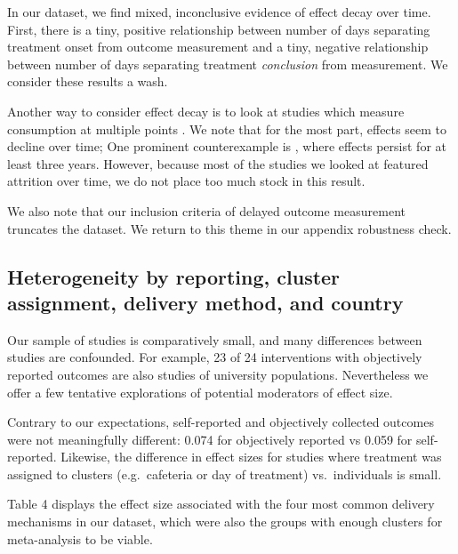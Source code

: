 \documentclass[sn-nature,referee,pdflatex]{sn-jnl}
\begin{document}
In our dataset, we find mixed, inconclusive evidence of effect decay
over time. First, there is a tiny, positive relationship between number
of days separating treatment onset from outcome measurement and a tiny,
negative relationship between number of days separating treatment
\emph{conclusion} from measurement. We consider these results a wash.

Another way to consider effect decay is to look at studies which measure
consumption at multiple points
\citep[e.g.][]{bianchi2022, bochmann2017, bschaden2020, carfora2023, jalil2023}.
We note that for the most part, effects seem to decline over time; One
prominent counterexample is \citep{jalil2023}, where effects persist for
at least three years. However, because most of the studies we looked at
featured attrition over time, we do not place too much stock in this
result.

We also note that our inclusion criteria of delayed outcome measurement
truncates the dataset. We return to this theme in our appendix
robustness check.

\begin{comment} There is probably a way to do this quantitatively and if we get asked to do it in review, I'll do it, but it's a fair bit of work and I think we've made the general point 
\end{comment}

\subsection{Heterogeneity by reporting, cluster assignment, delivery
method, and country}\label{sec2.11}

Our sample of studies is comparatively small, and many differences
between studies are confounded. For example, 23 of 24 interventions with
objectively reported outcomes are also studies of university
populations. Nevertheless we offer a few tentative explorations of
potential moderators of effect size.

Contrary to our expectations, self-reported and objectively collected
outcomes were not meaningfully different: 0.074 for objectively reported
vs 0.059 for self-reported. Likewise, the difference in effect sizes for
studies where treatment was assigned to clusters (e.g.~cafeteria or day
of treatment) vs.~individuals is small.

Table 4 displays the effect size associated with the four most common
delivery mechanisms in our dataset, which were also the groups with
enough clusters for meta-analysis to be viable.
\end{document}

